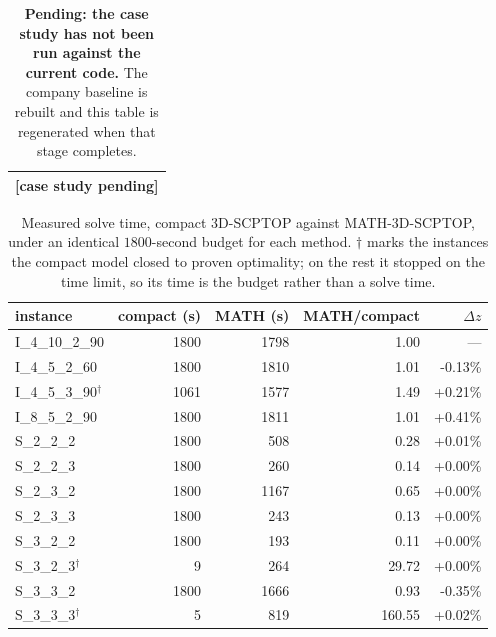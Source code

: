 \begin{table}[!htbp]
\centering
\small
\caption{\textbf{Pending: the case study has not been run against the current code.} The company baseline is rebuilt and this table is regenerated when that stage completes.}
\label{tab:case}
\begin{tabular}{l}
\toprule
{}[case study pending] \\
\bottomrule
\end{tabular}
\end{table}

\begin{table}[!htbp]
\centering
\small
\caption{Measured solve time, compact 3D-SCPTOP against MATH-3D-SCPTOP, under an identical $1800$-second budget for each method. $\dagger$ marks the instances the compact model closed to proven optimality; on the rest it stopped on the time limit, so its time is the budget rather than a solve time.}
\label{tab:times-exact}
\begin{tabular}{lrrrr}
\toprule
instance & compact (s) & MATH (s) & MATH/compact & $\Delta z$ \\
\midrule
I\_4\_10\_2\_90 & 1800 & 1798 & 1.00 & --- \\
I\_4\_5\_2\_60 & 1800 & 1810 & 1.01 & -0.13\% \\
I\_4\_5\_3\_90$^\dagger$ & 1061 & 1577 & 1.49 & +0.21\% \\
I\_8\_5\_2\_90 & 1800 & 1811 & 1.01 & +0.41\% \\
S\_2\_2\_2 & 1800 & 508 & 0.28 & +0.01\% \\
S\_2\_2\_3 & 1800 & 260 & 0.14 & +0.00\% \\
S\_2\_3\_2 & 1800 & 1167 & 0.65 & +0.00\% \\
S\_2\_3\_3 & 1800 & 243 & 0.13 & +0.00\% \\
S\_3\_2\_2 & 1800 & 193 & 0.11 & +0.00\% \\
S\_3\_2\_3$^\dagger$ & 9 & 264 & 29.72 & +0.00\% \\
S\_3\_3\_2 & 1800 & 1666 & 0.93 & -0.35\% \\
S\_3\_3\_3$^\dagger$ & 5 & 819 & 160.55 & +0.02\% \\
\bottomrule
\end{tabular}
\end{table}

